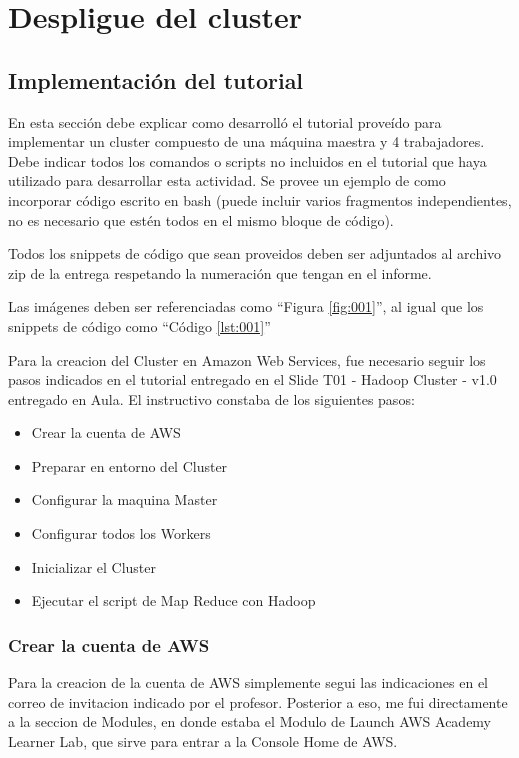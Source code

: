 \documentclass[12pt,letterpaper,twoside]{article}
\begin{document}
\section{Despligue del cluster}

\subsection{Implementación del tutorial}

{\color{red} En esta sección debe explicar como desarrolló el tutorial proveído para implementar un cluster compuesto de una máquina maestra y 4 trabajadores. Debe indicar todos los comandos o scripts no incluidos en el tutorial que haya utilizado para desarrollar esta actividad. Se provee un ejemplo de como incorporar código escrito en bash (puede incluir varios fragmentos independientes, no es necesario que estén todos en el mismo bloque de código).}

{\color{red} Todos los snippets de código que sean proveidos deben ser adjuntados al archivo zip de la entrega respetando la numeración que tengan en el informe.}

{\color{red} Las imágenes deben ser referenciadas como ``Figura \ref{fig:001}'', al igual que los snippets de código como ``Código \ref{lst:001}''}

Para la creacion del Cluster en Amazon Web Services, fue necesario seguir los pasos indicados en el tutorial
entregado en el Slide T01 - Hadoop Cluster - v1.0 entregado en Aula. El instructivo constaba de los siguientes
pasos:
\begin{itemize}
    \item Crear la cuenta de AWS
    \item Preparar en entorno del Cluster
    \item Configurar la maquina Master
    \item Configurar todos los Workers
    \item Inicializar el Cluster
    \item Ejecutar el script de Map Reduce con Hadoop
\end{itemize}

\subsubsection*{Crear la cuenta de AWS}
Para la creacion de la cuenta de AWS simplemente segui las indicaciones en el correo de invitacion indicado por el profesor.
Posterior a eso, me fui directamente a la seccion de Modules, en donde estaba el Modulo de Launch AWS Academy Learner Lab,
que sirve para entrar a la Console Home de AWS.
\end{document}
